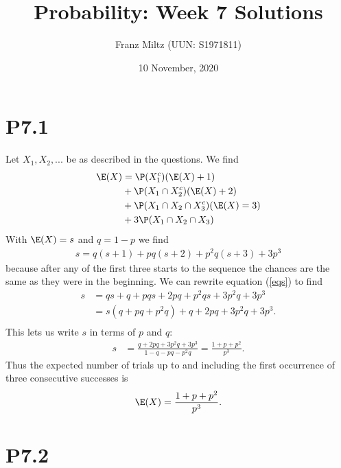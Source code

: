 \documentclass{article}
\begin{document}
\title{Probability: Week 7 Solutions}
\author{Franz Miltz (UUN: S1971811)}
\date{10 November, 2020}
\maketitle


\section*{P7.1}


Let $X_1,X_2,...$ be as described in the questions. We find
\begin{align*}
  \E(X) & = \P(X_1^c)(\E(X)+1)                \\
        & +\P(X_1\cap X_2^c)(\E(X)+2)         \\
        & +\P(X_1\cap X_2\cap X_3^c)(\E(X)=3) \\
        & +3\P(X_1\cap X_2\cap X_3)
\end{align*}
With $\E(X)=s$ and $q=1-p$ we find
\begin{align}
  \label{eqs}
  s = q(s+1) + pq(s+2) + p^2q(s+3) +3p^3
\end{align}
because after any of the first three starts to the sequence the chances
are the same as they were in the beginning.
We can rewrite equation (\ref{eqs}) to find
\begin{align*}
  s & = qs + q + pqs + 2pq + p^2qs + 3p^2q + 3p^3 \\
    & = s(q+pq+p^2q)+q + 2pq + 3p^2q + 3p^3.      \\
\end{align*}
This lets us write $s$ in terms of $p$ and $q$:
\begin{align*}
  s & = \frac{q+2pq+3p^2q+3p^3}{1-q-pq-p^2q} =\frac{1+p+p^2}{p^3}.
\end{align*}
Thus the expected number of trials up to and including the first occurrence of
three consecutive successes is
\begin{align*}
  \E(X) = \frac{1+p+p^2}{p^3}.
\end{align*}


\section*{P7.2}
\end{document}
